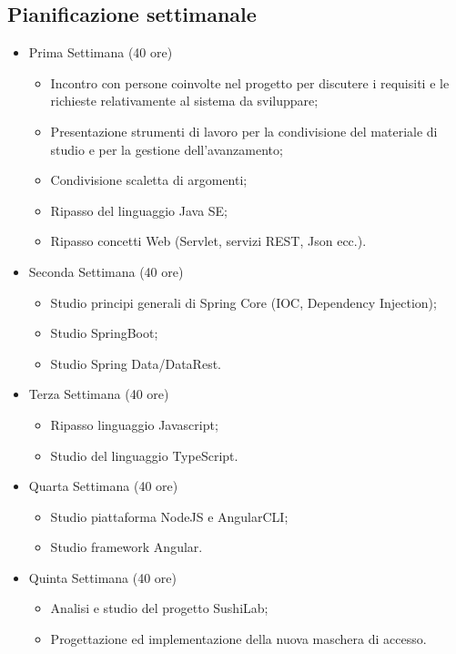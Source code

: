 \subsection*{Pianificazione settimanale}
\begin{itemize}
    \item Prima Settimana (40 ore)
    \begin{itemize}
        \item Incontro con persone coinvolte nel progetto per discutere i requisiti e le richieste relativamente
        al sistema da sviluppare;
        \item Presentazione strumenti di lavoro per la condivisione del materiale di studio e per la gestione
        dell'avanzamento;
        \item Condivisione scaletta di argomenti;
        \item Ripasso del linguaggio Java SE;
        \item Ripasso concetti Web (Servlet, servizi REST, Json ecc.).
    \end{itemize}
    \item Seconda Settimana (40 ore)
        \begin{itemize}
            \item Studio principi generali di Spring Core (IOC, Dependency Injection);
            \item Studio SpringBoot;
            \item Studio Spring Data/DataRest.
        \end{itemize}
    \item Terza Settimana (40 ore)
        \begin{itemize}
            \item Ripasso linguaggio Javascript;
            \item Studio del linguaggio TypeScript.
        \end{itemize}
    \item Quarta Settimana (40 ore)
        \begin{itemize}
            \item Studio piattaforma NodeJS e AngularCLI;
            \item Studio framework Angular.
        \end{itemize}
    \item Quinta Settimana (40 ore)
        \begin{itemize}
        \item Analisi e studio del progetto SushiLab;
        \item Progettazione ed implementazione della nuova maschera di accesso.

\end{itemize}
\end{itemize}
